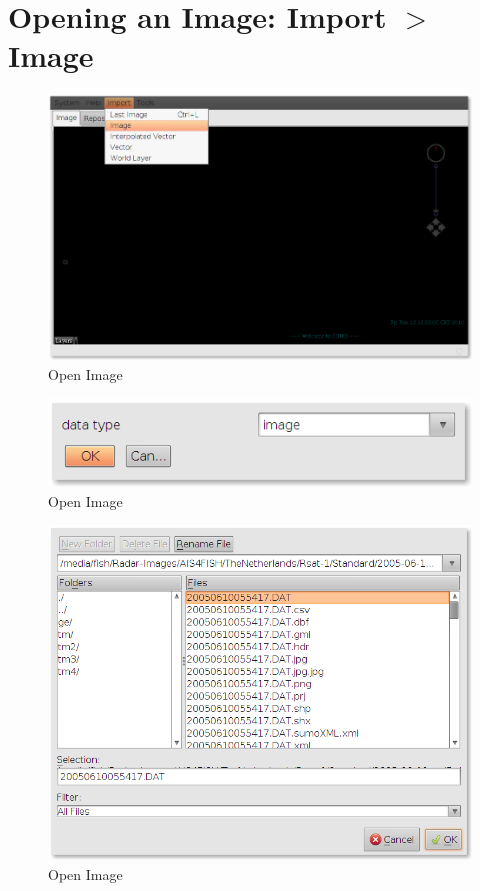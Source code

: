 \documentclass[12pt,a4paper,final]{report}
\begin{document}
\section{Opening an Image: Import $>$ Image}
\begin{figure}[H]
 \centering
 \includegraphics[scale=0.45,keepaspectratio=true]{./images/ImportImage.png}
 \caption{Open Image}
\end{figure}
\begin{figure}[H]
 \centering
 \includegraphics[scale=0.45,keepaspectratio=true]{./images/ImportImage2.png}
 \caption{Open Image}
\end{figure}
\begin{figure}[H]
 \centering
 \includegraphics[scale=0.45,keepaspectratio=true]{./images/ImportImage3.png}
 \caption{Open Image}
\end{figure}
\end{document}

